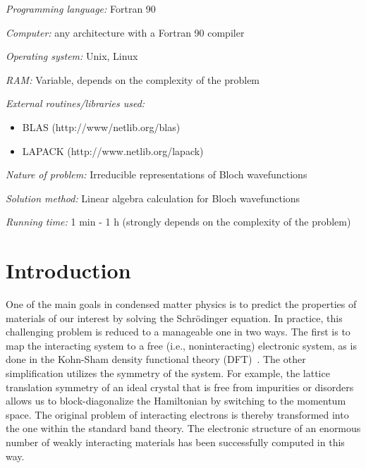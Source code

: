 \documentclass[3p,preprint]{elsarticle}
\newcommand{\akishi}[1]{ { \color{magenta} \footnotesize (\textsf{AM}) \textsf{\textsl{#1}} } }
\begin{document}



\noindent\textit{Programming language:} Fortran 90

\noindent\textit{Computer:} any architecture with a Fortran 90 compiler

\noindent\textit{Operating system:} Unix, Linux


\noindent\textit{RAM:} Variable, depends on the complexity of the problem


\noindent\textit{External routines/libraries used:} 
\begin{itemize}
\item BLAS (http://www/netlib.org/blas)
\item LAPACK (http://www.netlib.org/lapack)
\end{itemize}

\noindent\textit{Nature of problem:} Irreducible representations of Bloch wavefunctions

\noindent\textit{Solution method:}  Linear algebra calculation for Bloch wavefunctions 

\noindent\textit{Running time:} 1 min - 1 h (strongly depends on the complexity of the problem)



\section{Introduction}
\label{sec1}
One of the main goals in condensed matter physics is to predict the properties of materials of our interest by solving the Schr\"odinger equation.  
In practice, this challenging problem is reduced to a manageable one in two ways.  The first is to map the interacting system to a free (i.e., noninteracting) electronic system, as is done in the Kohn-Sham density functional theory (DFT)~\cite{KS}.  The other simplification utilizes the symmetry of the system. For example, the lattice translation symmetry of an ideal crystal that is free from impurities or disorders allows us to block-diagonalize the Hamiltonian by switching to the momentum space. The original problem of interacting electrons is thereby transformed into the one within the standard band theory. The electronic structure of an enormous number of weakly interacting materials has been successfully computed in this way.
\end{document}
